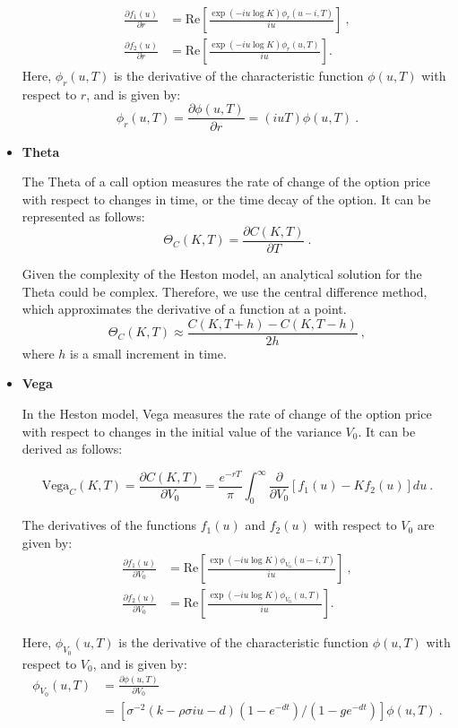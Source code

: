 \begin{itemize}
\begin{equation}
\label{eq:derivative-r-f1-f2}
\begin{aligned}
\frac{ \partial  f_1(u)   }{\partial r}&= \mathrm{Re}\left[  \frac{\exp(-iu\log K) \phi_{r}(u-i,T)   }{iu}\right] \ ,  \\  
\frac{\partial  f_2(u)   }{\partial r } &= \mathrm{Re}\left[ \frac{\exp(-iu\log K) \phi_{r}(u,T)  }{iu}\right].
\end{aligned}
\end{equation}
Here, $\phi_{r}(u,T)$ is the derivative of the characteristic function $\phi(u,T)$ with respect to $r$, and is given by:
$$
\phi_{r}(u,T) = \frac{ \partial  \phi(u,T)}{\partial r} = (i u T) \phi(u,T) \ .
$$




\item \textbf{Theta} 

The Theta of a call option measures the rate of change of the option price with respect to changes in time, or the time decay of the option. It can be represented as follows:
$$
\Theta_C(K,T) = \frac{\partial C(K,T)}{\partial T} \ . 
$$

Given the complexity of the Heston model, an analytical solution for the Theta could be complex. Therefore, we use the central difference method, which approximates the derivative of a function at a point.
$$
\Theta_C(K,T) \approx \frac{C(K,T+h) - C(K,T-h)}{2h} \ , 
$$
where $h$ is a small increment in time. 


\item \textbf{Vega} 

In the Heston model, Vega measures the rate of change of the option price with respect to changes in the initial value of the variance $V_0$. It can be derived as follows:

$$
\text{Vega}_C(K,T) = \frac{\partial C(K,T)}{\partial V_0} = \frac{e^{-r T}}{\pi} \int_0^{\infty}\frac{ \partial  }{\partial V_0}  \left[f_1(u) - Kf_2(u)\right]du \ . 
$$

The derivatives of the functions $ f_1(u) $ and $ f_2(u) $ with respect to $ V_0$ are given by:
\begin{equation}
\label{eq:derivative-v0-f1-f2}
\begin{aligned}
\frac{ \partial  f_1(u)   }{\partial V_0}&= \mathrm{Re}\left[  \frac{\exp(-iu\log K) \phi_{V_0}(u-i,T)   }{iu}\right]  \ , \\  
\frac{\partial  f_2(u)   }{\partial V_0 } &= \mathrm{Re}\left[ \frac{\exp(-iu\log K) \phi_{V_0}(u,T)  }{iu}\right].
\end{aligned}
\end{equation}

Here, $\phi_{V_0}(u,T)$ is the derivative of the characteristic function $\phi(u,T)$ with respect to $V_0$, and is given by:
$$
\begin{aligned}
\phi_{V_0}(u,T) &= \frac{ \partial  \phi(u,T)}{\partial V_0} \\ &= \left[ \sigma^{-2}(k-\rho\sigma iu - d)(1-e^{-dt})/(1-ge^{-dt}) \right] \phi(u,T) \ . 
\end{aligned}
$$

\end{itemize}




